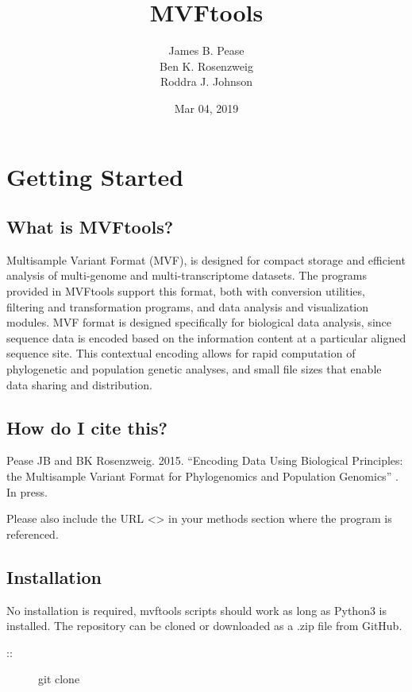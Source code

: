 \documentclass[letterpaper,11pt,english]{sphinxmanual}
\title{MVFtools}
\date{Mar 04, 2019}
\author{James B. Pease\\Ben K. Rosenzweig\\Roddra J. Johnson}
\begin{document}
\maketitle
\sphinxtableofcontents
{}\label{\detokenize{index::doc}}



\chapter{Getting Started}
\label{\detokenize{intro:intro}}\label{\detokenize{intro::doc}}\label{\detokenize{intro:welcome-to-mvftools-s-documentation}}\label{\detokenize{intro:getting-started}}

\section{What is MVFtools?}
\label{\detokenize{intro:what-is-mvftools}}
Multisample Variant Format (MVF), is designed for compact storage and efficient analysis of multi-genome and multi-transcriptome datasets.  The programs provided in MVFtools support this format, both with conversion utilities, filtering and transformation programs, and data analysis and visualization modules.  MVF format is designed specifically for biological data analysis, since sequence data is encoded based on the information content at a particular aligned sequence site.  This contextual encoding allows for rapid computation of phylogenetic and population genetic analyses, and small file sizes that enable data sharing and distribution.


\section{How do I cite this?}
\label{\detokenize{intro:how-do-i-cite-this}}
Pease JB and BK Rosenzweig. 2015. “Encoding Data Using Biological Principles: the Multisample Variant Format for Phylogenomics and Population Genomics” . In press. 

Please also include the URL \textless{}\textgreater{} in your methods section where the program is referenced.


\section{Installation}
\label{\detokenize{intro:installation}}
No installation is required, mvftools scripts should work as long as Python3 is installed.  The repository can be cloned or downloaded as a .zip file from GitHub.
\begin{description}
\item[{::}] \leavevmode
git clone 

\end{description}
\end{document}
